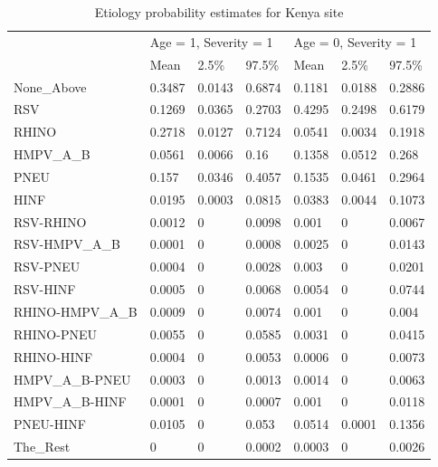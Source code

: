 \documentclass[11 pt, a4paper]{article}  %
\begin{document}
\begin{table}[htbp]
\centering
\caption{Etiology probability estimates for Kenya site}
\label{tab:kenya2}
\begin{tabular}{lllllll}
\hline
                 & \multicolumn{3}{l}{Age = 1, Severity = 1} & \multicolumn{3}{l}{Age = 0, Severity = 1} \\
                 & Mean         & 2.5\%        & 97.5\%      & Mean         & 2.5\%        & 97.5\%      \\ \hline
None\_Above      & 0.3487       & 0.0143       & 0.6874      & 0.1181       & 0.0188       & 0.2886      \\
RSV              & 0.1269       & 0.0365       & 0.2703      & 0.4295       & 0.2498       & 0.6179      \\
RHINO            & 0.2718       & 0.0127       & 0.7124      & 0.0541       & 0.0034       & 0.1918      \\
HMPV\_A\_B       & 0.0561       & 0.0066       & 0.16        & 0.1358       & 0.0512       & 0.268       \\
PNEU             & 0.157        & 0.0346       & 0.4057      & 0.1535       & 0.0461       & 0.2964      \\
HINF             & 0.0195       & 0.0003       & 0.0815      & 0.0383       & 0.0044       & 0.1073      \\
RSV-RHINO        & 0.0012       & 0            & 0.0098      & 0.001        & 0            & 0.0067      \\
RSV-HMPV\_A\_B   & 0.0001       & 0            & 0.0008      & 0.0025       & 0            & 0.0143      \\
RSV-PNEU         & 0.0004       & 0            & 0.0028      & 0.003        & 0            & 0.0201      \\
RSV-HINF         & 0.0005       & 0            & 0.0068      & 0.0054       & 0            & 0.0744      \\
RHINO-HMPV\_A\_B & 0.0009       & 0            & 0.0074      & 0.001        & 0            & 0.004       \\
RHINO-PNEU       & 0.0055       & 0            & 0.0585      & 0.0031       & 0            & 0.0415      \\
RHINO-HINF       & 0.0004       & 0            & 0.0053      & 0.0006       & 0            & 0.0073      \\
HMPV\_A\_B-PNEU  & 0.0003       & 0            & 0.0013      & 0.0014       & 0            & 0.0063      \\
HMPV\_A\_B-HINF  & 0.0001       & 0            & 0.0007      & 0.001        & 0            & 0.0118      \\
PNEU-HINF        & 0.0105       & 0            & 0.053       & 0.0514       & 0.0001       & 0.1356      \\
The\_Rest        & 0            & 0            & 0.0002      & 0.0003       & 0            & 0.0026      \\ \hline
\end{tabular}
\end{table}
\end{document}
